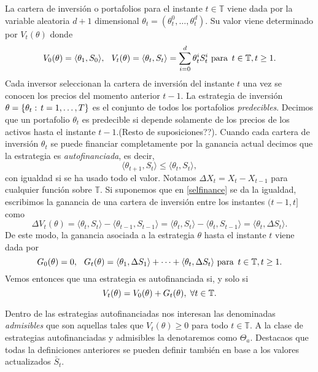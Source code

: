 La cartera de inversión o portafolios para el instante $ t \in \mathbb{T} $ viene dada por la variable aleatoria $ d+1 $ dimensional $ \theta_t = (\theta_t^0,\dots,\theta_t^d) $. Su valor viene determinado por $ V_t(\theta) $ donde
\[
V_0(\theta) = \langle \theta_1 , S_0\rangle, \hspace{2.5mm} V_t(\theta) = \langle \theta_t , S_t\rangle = \sum_{i=0}^{d} \theta_t^i S_t^i \text{ para } \hspace{0.5mm} t \in \mathbb{T}, t \geq 1.
\]
Cada inversor seleccionan la cartera de inversión del instante $ t $ una vez se conocen los precios del momento anterior $ t-1 $. La estrategia de inversión $ \theta = \{\theta_t: \hspace{0.5mm}t=1,\dots,T\} $ es el conjunto de todos los portafolios \textit{predecibles}. Decimos que un portafolio $ \theta_{t} $ es predecible si depende solamente de los precios de los activos hasta el instante $ t-1 $.(Resto de suposiciones??). Cuando cada cartera de inversión $ \theta_t $ se puede financiar completamente por la ganancia actual decimos que la estrategia es \textit{autofinanciada}, es decir, 
\begin{equation}\label{selfinance}
\langle \theta_{t+1}, S_t \rangle \leq \langle \theta_{t}, S_t \rangle,
\end{equation}
con igualdad si se ha usado todo el valor. Notamos $ \Delta X_t = X_t - X_{t-1} $ para cualquier función sobre $ \mathbb{T} $. Si suponemos que en \ref{selfinance} se da la igualdad, escribimos la ganancia de una cartera de inversión entre los instantes $ (t-1,t] $ como
\[
\Delta V_t(\theta) = \langle\theta_t, S_t \rangle - \langle\theta_{t-1}, S_{t-1}\rangle = \langle\theta_t, S_t \rangle - \langle\theta_{t}, S_{t-1}\rangle = \langle\theta_{t}, \Delta S_{t}\rangle.
\]
De este modo, la ganancia asociada a la estrategia $ \theta $ hasta el instante $ t $ viene dada por
\[
G_0(\theta) = 0, \hspace{2.5mm} G_t(\theta) = \langle\theta_{1}, \Delta S_{1}\rangle + \cdots + \langle\theta_{t}, \Delta S_{t}\rangle \text{ para } \hspace{0.5mm} t \in \mathbb{T}, t \geq 1.
\]
Vemos entonces que una estrategia es autofinanciada si, y solo si
\begin{equation}\label{selfinifonlyif}
V_t(\theta) = V_0(\theta) + G_t(\theta), \hspace{1mm} \forall t \in \mathbb{T}.
\end{equation}

Dentro de las estrategias autofinanciadas nos interesan las denominadas \textit{admisibles} que son aquellas tales que $ V_t (\theta) \geq 0$ para todo $ t \in \mathbb{T} $. A la clase de estrategias autofinanciadas y admisibles la denotaremos como $ \Theta_a $. Destacaos que todas la definiciones anteriores se pueden definir también en base a los valores actualizados $ \bar{S}_t $. \\

